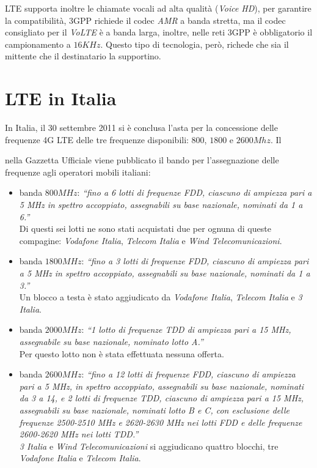 \ac{LTE} supporta inoltre le chiamate vocali ad alta qualità (\emph{Voice HD}), per garantire la compatibilità, \ac{3GPP} richiede il codec
\emph{AMR} a banda stretta, ma il codec consigliato per il \emph{VoLTE} è a banda larga, inoltre, nelle reti \ac{3GPP} è obbligatorio il 
campionamento a $16 KHz$. Questo tipo di tecnologia, però, richede che sia il mittente che il destinatario la supportino.


\section{LTE in Italia}
In Italia, il 30 settembre 2011 si è conclusa l'asta per la concessione delle frequenze 4G \ac{LTE} delle tre frequenze disponibili: 
$800$, $1800$ e $2600 Mhz$. Il \date{27 Giugno 2011} nella Gazzetta Ufficiale viene pubblicato il bando per l'assegnazione delle 
frequenze agli operatori mobili italiani:
\begin{itemize}
 \item banda $800 MHz$: \emph{``fino a 6 lotti di frequenze FDD, ciascuno di ampiezza pari a 5 MHz in spettro accoppiato, assegnabili su base 
 nazionale, nominati da 1 a 6.''} \\
 Di questi sei lotti ne sono stati acquistati due per ognuna di queste compagine: \emph{Vodafone Italia}, 
 \emph{Telecom Italia} e \emph{Wind Telecomunicazioni}.
 \item banda $1800 MHz$: \emph{``fino a 3 lotti di frequenze FDD, ciascuno di ampiezza pari a 5 MHz in spettro accoppiato, assegnabili su base 
 nazionale, nominati da 1 a 3.''} \\
 Un blocco a testa è stato aggiudicato da \emph{Vodafone Italia}, \emph{Telecom Italia} e \emph{3 Italia}.
 \item banda $2000 MHz$: \emph{``1 lotto di frequenze TDD di ampiezza pari a 15 MHz, assegnabile su base nazionale, nominato lotto A.''} \\
 Per questo  lotto non è stata effettuata nessuna offerta.
 \item banda $2600 MHz$: \emph{``fino a 12 lotti di frequenze FDD, ciascuno di ampiezza pari a 5 MHz, in spettro accoppiato, assegnabili su base 
 nazionale, nominati da 3 a 14, e 2 lotti di frequenze TDD, ciascuno di ampiezza pari a 15 MHz, assegnabili su base nazionale, nominati 
 lotto B e C, con esclusione delle frequenze 2500-2510 MHz e 2620-2630 MHz nei lotti FDD e delle frequenze 2600-2620 MHz nei lotti TDD.''} \\
 \emph{3 Italia} e \emph{Wind Telecomunicazioni} si aggiudicano quattro blocchi, tre \emph{Vodafone Italia} e \emph{Telecom Italia}.
\end{itemize}

